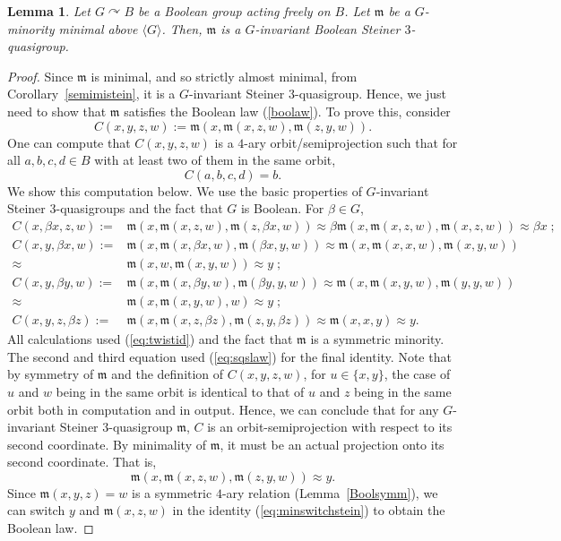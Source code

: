 \documentclass{article}
\newtheorem{lemma}[theorem]{Lemma}
\theoremstyle{remark}
\theoremstyle{definition}
\def\acts{\curvearrowright}
\begin{document}
\begin{lemma}\label{lem:minBool} Let $G\acts B$ be a Boolean group acting freely on $B$. Let $\mathfrak{m}$ be a $G$-minority minimal above $\langle G \rangle$. Then, $\mathfrak{m}$ is a $G$-invariant Boolean Steiner $3$-quasigroup. 
\end{lemma}
\begin{proof} Since $\mathfrak{m}$ is minimal, and so strictly almost minimal, from Corollary~\ref{semimistein}, it is a $G$-invariant Steiner $3$-quasigroup.  Hence, we just need to show that $\mathfrak{m}$ satisfies the Boolean law (\ref{boolaw}). To prove this, consider 
\[C(x,y,z,w):=\mathfrak{m}(x, \mathfrak{m}(x,z,w), \mathfrak{m}(z,y,w)).\]
One can compute that $C(x,y, z, w)$ is a $4$-ary orbit\-/semiprojection such that for all $a, b, c, d\in B$ with at least two of them in the same orbit,
\[C(a, b, c, d)=b.\]
We show this computation below. We use the basic properties of $G$-invariant Steiner $3$-quasigroups and the fact that $G$ is Boolean. For $\beta\in G$,
\begin{align*}
C(x,\beta x, z,w) := & \mathfrak{m}(x, \mathfrak{m}(x,z,w), \mathfrak{m}(z,\beta x,w)) \approx 
 \beta \mathfrak{m}(x, \mathfrak{m}(x,z,w), \mathfrak{m}(x, z, w))  \approx  \beta x \; ;\\
C(x, y, \beta x, w) :=& \mathfrak{m}(x, \mathfrak{m}(x,\beta x,w), \mathfrak{m}(\beta x,y,w)) \approx \mathfrak{m}(x, \mathfrak{m}(x,x,w), \mathfrak{m}(x,y,w)) \\
\approx & \mathfrak{m}(x, w, \mathfrak{m}(x,y,w)) \approx  y \; ;\\
C(x,y, \beta y, w) :=& \mathfrak{m}(x, \mathfrak{m}(x,\beta y,w), \mathfrak{m}(\beta y,y,w))  \approx  \mathfrak{m}(x, \mathfrak{m}(x,y,w), \mathfrak{m}(y,y,w)) \\
\approx & \mathfrak{m}(x, \mathfrak{m}(x,y,w), w) \approx y \; ;\\
C(x,y, z, \beta z) :=& \mathfrak{m}(x, \mathfrak{m}(x,z,\beta z), \mathfrak{m}(z,y,\beta z)) \approx \mathfrak{m}(x, x, y) \approx  y.
\end{align*}
All calculations used (\ref{eq:twistid}) and the fact that $\mathfrak{m}$ is a symmetric minority. The second and third equation used (\ref{eq:sqslaw}) for the final identity. Note that by symmetry of $\mathfrak{m}$ and the definition of $C(x,y,z,w)$, for $u\in\{x,y\}$, the case of $u$ and $w$ being in the same orbit is identical to that of $u$ and $z$ being in the same orbit both in computation and in output. Hence, we can conclude that for any $G$-invariant Steiner $3$-quasigroup $\mathfrak{m}$, $C$ is an orbit-semiprojection with respect to its second coordinate. By minimality of $\mathfrak{m}$, it must be an actual projection onto its second coordinate. That is, 
\begin{equation}\label{eq:minswitchstein}
    \mathfrak{m}(x, \mathfrak{m}(x,z,w), \mathfrak{m}(z,y,w))\approx y.
\end{equation}
Since $\mathfrak{m}(x,y,z)=w$ is a symmetric $4$-ary relation (Lemma~\ref{Boolsymm}), we can switch $y$ and $\mathfrak{m}(x,z,w)$ in the identity (\ref{eq:minswitchstein}) to obtain the Boolean law.
\end{proof}
\end{document}
